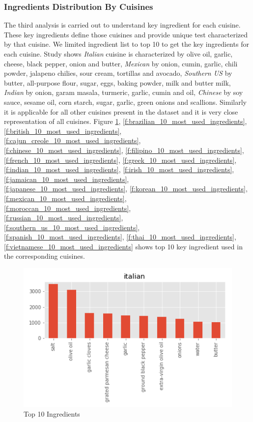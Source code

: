\documentclass[sigconf]{acmart}
\begin{document}
\subsubsection{Ingredients Distribution By Cuisines}
The third analysis is carried out to understand key ingredient for each cuisine. These key ingredients define those cuisines and provide unique test characterized by that cuisine. We limited ingredient list to top 10 to get the key ingredients for each cuisine. Study shows \emph{Italian} cuisine is characterized by olive oil, garlic, cheese, black pepper, onion and butter, \emph{Mexican} by onion, cumin, garlic, chili powder, jalapeno chilies, sour cream, tortillas and avocado, \emph{Southern US} by butter, all-purpose flour, sugar, eggs, baking powder, milk and butter milk, \emph{Indian} by onion, garam masala, turmeric, garlic, cumin and oil, \emph{Chinese} by soy sauce, sesame oil, corn starch, sugar, garlic, green onions and scallions. Similarly it is applicable for all other cuisines present in the dataset and it is very close representation of all cuisines. Figure \ref{f:italian_10_most_used_ingredients}, \ref{f:brazilian_10_most_used_ingredients}, \ref{f:british_10_most_used_ingredients}, \ref{f:cajun_creole_10_most_used_ingredients}, \ref{f:chinese_10_most_used_ingredients}, \ref{f:filipino_10_most_used_ingredients}, \ref{f:french_10_most_used_ingredients}, \ref{f:greek_10_most_used_ingredients}, \ref{f:indian_10_most_used_ingredients}, \ref{f:irish_10_most_used_ingredients}, \ref{f:jamaican_10_most_used_ingredients}, \ref{f:japanese_10_most_used_ingredients}, \ref{f:korean_10_most_used_ingredients}, \ref{f:mexican_10_most_used_ingredients}, \ref{f:moroccan_10_most_used_ingredients}, \ref{f:russian_10_most_used_ingredients}, \ref{f:southern_us_10_most_used_ingredients}, \ref{f:spanish_10_most_used_ingredients}, \ref{f:thai_10_most_used_ingredients}, \ref{f:vietnamese_10_most_used_ingredients}  shows top 10 key ingredient used in the corresponding cuisines. 
\begin{figure}[!ht]
  \centering\includegraphics[width=\columnwidth]{images/italian_10_most_used_ingredients.png}
  \caption{Top 10 Ingredients }\label{f:italian_10_most_used_ingredients}
\end{figure}
\end{document}
